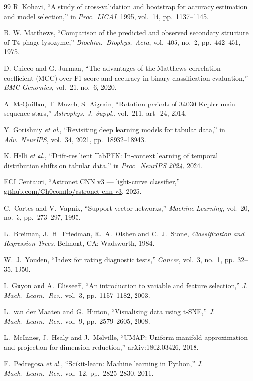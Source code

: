 \documentclass[conference]{IEEEtran}
\begin{document}
\begin{thebibliography}{99}
R. Kohavi, ``A study of cross-validation and bootstrap for accuracy
estimation and model selection,'' in \emph{Proc.\ IJCAI}, 1995, vol.~14,
pp.~1137--1145.

B. W. Matthews, ``Comparison of the predicted and observed secondary
structure of T4 phage lysozyme,'' \emph{Biochim.\ Biophys.\ Acta},
vol.~405, no.~2, pp.~442--451, 1975.

D. Chicco and G. Jurman, ``The advantages of the Matthews correlation
coefficient (MCC) over F1 score and accuracy in binary classification
evaluation,'' \emph{BMC Genomics}, vol.~21, no.~6, 2020.

A. McQuillan, T. Mazeh, S. Aigrain, ``Rotation periods of 34030 Kepler
main-sequence stars,'' \emph{Astrophys. J. Suppl.}, vol.~211, art.~24,
2014.

Y. Gorishniy \emph{et al.}, ``Revisiting deep learning models for
tabular data,'' in \emph{Adv.\ NeurIPS}, vol.~34, 2021,
pp.~18932--18943.

K. Helli \emph{et al.}, ``Drift-resilient TabPFN: In-context learning
of temporal distribution shifts on tabular data,'' in
\emph{Proc.\ NeurIPS 2024}, 2024.

ECI Centauri, ``Astronet CNN v3 --- light-curve classifier,''
\href{https://github.com/Ch0comilo/astronet-cnn-v3}
     {github.com/Ch0comilo/astronet-cnn-v3}, 2025.

C.\ Cortes and V.\ Vapnik, ``Support-vector networks,''
\emph{Machine Learning}, vol.~20, no.~3, pp.~273--297, 1995.

L.\ Breiman, J.\ H.\ Friedman, R.\ A.\ Olshen and C.\ J.\ Stone,
\emph{Classification and Regression Trees}.
Belmont, CA: Wadsworth, 1984.

W.\ J.\ Youden, ``Index for rating diagnostic tests,''
\emph{Cancer}, vol.~3, no.~1, pp.~32--35, 1950.

I.\ Guyon and A.\ Elisseeff, ``An introduction to variable and
feature selection,'' \emph{J. Mach.\ Learn.\ Res.}, vol.~3,
pp.~1157--1182, 2003.

L.\ van der Maaten and G.\ Hinton, ``Visualizing data using
t-SNE,'' \emph{J. Mach.\ Learn.\ Res.}, vol.~9, pp.~2579--2605,
2008.

L.\ McInnes, J.\ Healy and J.\ Melville, ``UMAP: Uniform manifold
approximation and projection for dimension reduction,''
arXiv:1802.03426, 2018.

F.\ Pedregosa \emph{et al.}, ``Scikit-learn: Machine learning in
Python,'' \emph{J. Mach.\ Learn.\ Res.}, vol.~12, pp.~2825--2830,
2011.

\end{thebibliography}
\end{document}
